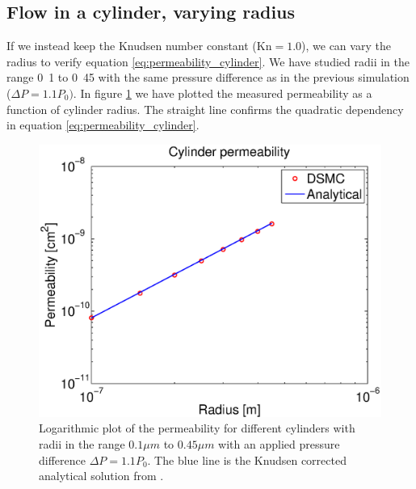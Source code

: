 \subsection{Flow in a cylinder, varying radius}
If we instead keep the Knudsen number constant ($\text{Kn}=1.0$), we can vary the radius to verify equation \eqref{eq:permeability_cylinder}. We have studied radii in the range \unit{0.1}{\micro\meter} to \unit{0.45}{\micro\meter} with the same pressure difference as in the previous simulation ($\Delta P = 1.1P_0)$. In figure \ref{fig:one_cylinder_varying_radii_result} we have plotted the measured permeability as a function of cylinder radius. The straight line confirms the quadratic dependency in equation \eqref{eq:permeability_cylinder}.
\begin{figure}[h]
\begin{center}
\includegraphics[width=\textwidth, trim=0cm 0cm 0cm 0cm, clip]{DSMC/figures/cylinder_radius_permeability.eps}
\end{center}
\caption{Logarithmic plot of the permeability for different cylinders with radii in the range $0.1 \mu m$ to $0.45 \mu m$ with an applied pressure difference $\Delta P = 1.1P_0$. The blue line is the Knudsen corrected analytical solution from \cite{karniadakis2005microflows}.}
\label{fig:one_cylinder_varying_radii_result}
\end{figure}
